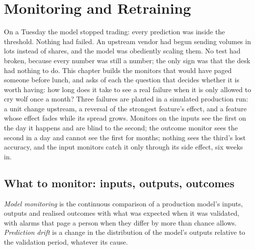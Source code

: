 \chapter{Monitoring and Retraining}\label{ch:ml:monitoring-and-retraining}

On a Tuesday the model stopped trading: every prediction was inside the threshold. Nothing had failed. An upstream vendor had
begun sending volumes in lots instead of shares, and the model was obediently scaling them. No test had broken, because every
number was still a number; the only sign was that the desk had nothing to do. This chapter builds the monitors that would have
paged someone before lunch, and asks of each the question that decides whether it is worth having: how long does it take to
see a real failure when it is only allowed to cry wolf once a month? Three failures are planted in a simulated production run: a
unit change upstream, a reversal of the strongest feature's effect, and a feature whose effect fades while its spread grows.
Monitors on the inputs see the first on the day it happens and are blind to the second; the outcome monitor sees the second in a
day and cannot see the first for months; nothing sees the third's lost accuracy, and the input monitors catch it only through its
side effect, six weeks in.

\section{What to monitor: inputs, outputs, outcomes}

\begin{definition}\label{def:ml:monitoring-and-retraining:monitoring}
\emph{Model monitoring} is the continuous comparison of a production model's inputs, outputs and
realised outcomes with what was expected when it was validated, with alarms that page a person when they differ by more than
chance allows. \emph{Prediction drift} is a change in the distribution of the model's outputs relative to
the validation period, whatever its cause.
\end{definition}


